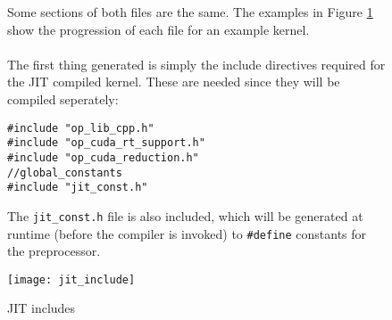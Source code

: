 \begin{figure}[h!]
\centering
\begin{minipage}{.55\textwidth}
Some sections of both files are the same. The examples in Figure \ref{fig:jit_include} show the progression of each file for an example kernel.
\\\\ The first thing generated is simply the include directives required for the JIT compiled kernel. These are needed since they will be compiled seperately:
\begin{footnotesize}
\lstset{xleftmargin=.25in}
\begin{lstlisting}
#include "op_lib_cpp.h"
#include "op_cuda_rt_support.h"
#include "op_cuda_reduction.h"
//global_constants
#include "jit_const.h"
\end{lstlisting}
\end{footnotesize}
The \verb|jit_const.h| file is also included, which will be generated at runtime (before the compiler is invoked) to \verb|#define| constants for the preprocessor.
\end{minipage}
\hfill
\begin{minipage}{.4\textwidth}
  \centering
  \texttt{[image: jit\_include]}
  \caption{JIT includes}
  \label{fig:jit_include}
\end{minipage}%
\end{figure}
